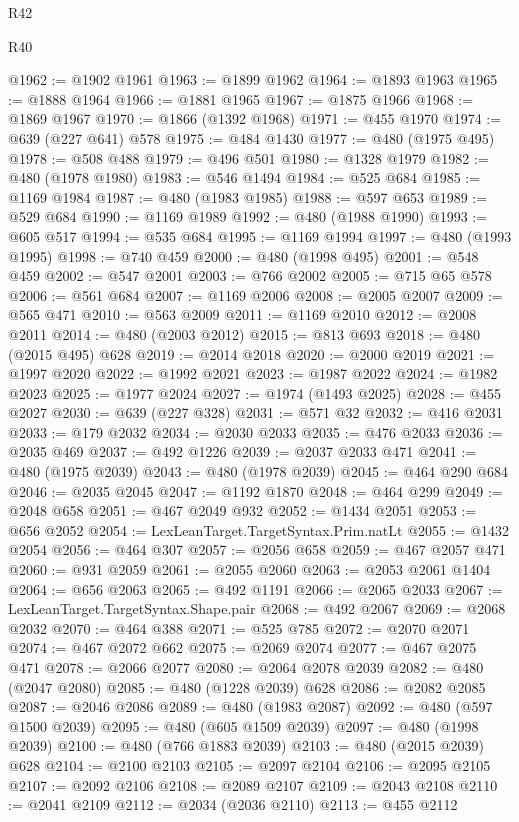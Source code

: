 \begin{lexlean}{R42}
\begin{lexlean}{R40}
\begin{coremodule}
{{{{{{{{{{{{{{{{{{{{{{{{{{{{{{{{{{{{{{{{{{{{{{{{{{{{{{{{{{{{{{{{{{{{{{{{{{{{{{{{{{{{{{{{{{{{{{{{{{{{{{{{{{{{{@1962 := @1902 @1961
@1963 := @1899 @1962
@1964 := @1893 @1963
@1965 := @1888 @1964
@1966 := @1881 @1965
@1967 := @1875 @1966
@1968 := @1869 @1967
@1970 := @1866 (@1392 @1968)
@1971 := @455 @1970
@1974 := @639 (@227 @641) @578
@1975 := @484 @1430
@1977 := @480 (@1975 @495)
@1978 := @508 @488
@1979 := @496 @501
@1980 := @1328 @1979
@1982 := @480 (@1978 @1980)
@1983 := @546 @1494
@1984 := @525 @684
@1985 := @1169 @1984
@1987 := @480 (@1983 @1985)
@1988 := @597 @653
@1989 := @529 @684
@1990 := @1169 @1989
@1992 := @480 (@1988 @1990)
@1993 := @605 @517
@1994 := @535 @684
@1995 := @1169 @1994
@1997 := @480 (@1993 @1995)
@1998 := @740 @459
@2000 := @480 (@1998 @495)
@2001 := @548 @459
@2002 := @547 @2001
@2003 := @766 @2002
@2005 := @715 @65 @578
@2006 := @561 @684
@2007 := @1169 @2006
@2008 := @2005 @2007
@2009 := @565 @471
@2010 := @563 @2009
@2011 := @1169 @2010
@2012 := @2008 @2011
@2014 := @480 (@2003 @2012)
@2015 := @813 @693
@2018 := @480 (@2015 @495) @628
@2019 := @2014 @2018
@2020 := @2000 @2019
@2021 := @1997 @2020
@2022 := @1992 @2021
@2023 := @1987 @2022
@2024 := @1982 @2023
@2025 := @1977 @2024
@2027 := @1974 (@1493 @2025)
@2028 := @455 @2027
@2030 := @639 (@227 @328)
@2031 := @571 @32
@2032 := @416 @2031
@2033 := @179 @2032
@2034 := @2030 @2033
@2035 := @476 @2033
@2036 := @2035 @469
@2037 := @492 @1226
@2039 := @2037 @2033 @471
@2041 := @480 (@1975 @2039)
@2043 := @480 (@1978 @2039)
@2045 := @464 @290 @684
@2046 := @2035 @2045
@2047 := @1192 @1870
@2048 := @464 @299
@2049 := @2048 @658
@2051 := @467 @2049 @932
@2052 := @1434 @2051
@2053 := @656 @2052
@2054 := LexLeanTarget.TargetSyntax.Prim.natLt
@2055 := @1432 @2054
@2056 := @464 @307
@2057 := @2056 @658
@2059 := @467 @2057 @471
@2060 := @931 @2059
@2061 := @2055 @2060
@2063 := @2053 @2061 @1404
@2064 := @656 @2063
@2065 := @492 @1191
@2066 := @2065 @2033
@2067 := LexLeanTarget.TargetSyntax.Shape.pair
@2068 := @492 @2067
@2069 := @2068 @2032
@2070 := @464 @388
@2071 := @525 @785
@2072 := @2070 @2071
@2074 := @467 @2072 @662
@2075 := @2069 @2074
@2077 := @467 @2075 @471
@2078 := @2066 @2077
@2080 := @2064 @2078 @2039
@2082 := @480 (@2047 @2080)
@2085 := @480 (@1228 @2039) @628
@2086 := @2082 @2085
@2087 := @2046 @2086
@2089 := @480 (@1983 @2087)
@2092 := @480 (@597 @1500 @2039)
@2095 := @480 (@605 @1509 @2039)
@2097 := @480 (@1998 @2039)
@2100 := @480 (@766 @1883 @2039)
@2103 := @480 (@2015 @2039) @628
@2104 := @2100 @2103
@2105 := @2097 @2104
@2106 := @2095 @2105
@2107 := @2092 @2106
@2108 := @2089 @2107
@2109 := @2043 @2108
@2110 := @2041 @2109
@2112 := @2034 (@2036 @2110)
@2113 := @455 @2112
}}}}}}}}}}}}}}}}}}}}}}}}}}}}}}}}}}}}}}}}}}}}}}}}}}}}}}}}}}}}}}}}}}}}}}}}}}}}}}}}}}}}}}}}}}}}}}}}}}}}}}}}}}}}}
\end{coremodule}
\end{lexlean}
\end{lexlean}
